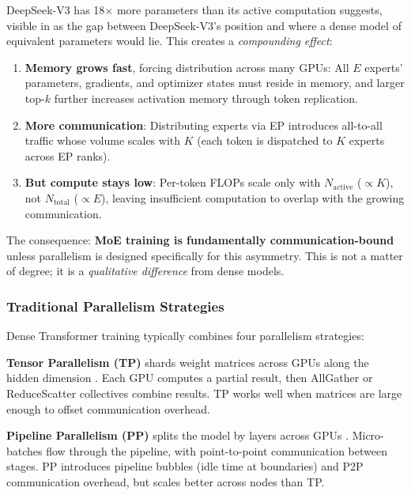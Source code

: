 DeepSeek-V3 has 18$\times$ more parameters than its active computation suggests, visible in  as the gap between DeepSeek-V3's position and where a dense model of equivalent parameters would lie. This creates a \emph{compounding effect}:

\begin{enumerate}
    \item \textbf{Memory grows fast}, forcing distribution across many GPUs: All $E$ experts' parameters, gradients, and optimizer states must reside in memory, and larger top-$k$ further increases activation memory through token replication.
    \item \textbf{More communication}: Distributing experts via EP introduces all-to-all traffic whose volume scales with $K$ (each token is dispatched to $K$ experts across EP ranks).
    \item \textbf{But compute stays low}: Per-token FLOPs scale only with $N_{\text{active}}$ ($\propto K$), not $N_{\text{total}}$ ($\propto E$), leaving insufficient computation to overlap with the growing communication.
\end{enumerate}

The consequence: \textbf{MoE training is fundamentally communication-bound} unless parallelism is designed specifically for this asymmetry. This is not a matter of degree; it is a \emph{qualitative difference} from dense models.

\subsubsection{Traditional Parallelism Strategies}\label{sec:traditional-parallelism}

Dense Transformer training typically combines four parallelism strategies:

\textbf{Tensor Parallelism (TP)} shards weight matrices across GPUs along the hidden dimension \cite{shoeybi2020megatronlmtrainingmultibillionparameter}. Each GPU computes a partial result, then AllGather or ReduceScatter collectives combine results. TP works well when matrices are large enough to offset communication overhead.

\textbf{Pipeline Parallelism (PP)} splits the model by layers across GPUs \cite{huang2019gpipe,narayanan2019pipedream,shoeybi2020megatronlmtrainingmultibillionparameter,qi2023zerobubblepipelineparallelism,qi2024pipelineparallelismcontrollablememory,zhang2022chimera,guan2025pipeoptimensuringeffective1f1b}. Micro-batches flow through the pipeline, with point-to-point communication between stages. PP introduces pipeline bubbles (idle time at boundaries) and P2P communication overhead, but scales better across nodes than TP.

